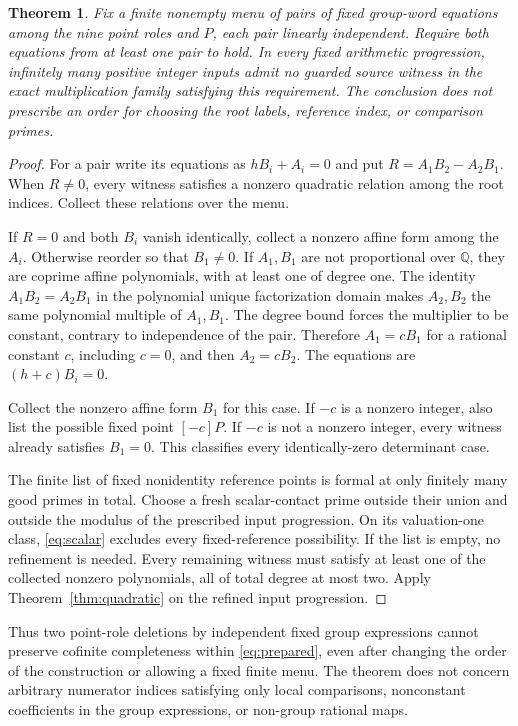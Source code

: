 \documentclass[11pt,a4paper]{article}
\newtheorem{theorem}{Theorem}[section]
\newcommand{\Q}{\mathbb Q}\newcommand{\Z}{\mathbb Z}
\begin{document}
\begin{theorem}\label{thm:two}
Fix a finite nonempty menu of pairs of fixed group-word equations
among the nine point roles and $P$, each pair linearly independent.
Require both equations from at least one pair to hold.
In every fixed arithmetic progression, infinitely many positive
integer inputs admit no guarded source witness in the exact
multiplication family satisfying this requirement. The conclusion
does not prescribe an order for choosing the root labels,
reference index, or comparison primes.
\end{theorem}
\begin{proof}
For a pair write its equations as $hB_i+A_i=0$ and put
$R=A_1B_2-A_2B_1$. When $R\ne0$, every witness satisfies a
nonzero quadratic relation among the root indices. Collect these
relations over the menu.

If $R=0$ and both $B_i$ vanish identically, collect a nonzero
affine form among the $A_i$. Otherwise reorder so that $B_1\ne0$.
If $A_1,B_1$ are not proportional over $\Q$, they are coprime
affine polynomials, with at least one of degree one. The identity
$A_1B_2=A_2B_1$ in the polynomial unique factorization domain
makes $A_2,B_2$ the same polynomial multiple of $A_1,B_1$.
The degree bound forces the multiplier to be constant, contrary
to independence of the pair. Therefore $A_1=cB_1$ for a rational
constant $c$, including $c=0$, and then $A_2=cB_2$. The equations
are $(h+c)B_i=0$.

Collect the nonzero affine form $B_1$ for this case. If $-c$ is
a nonzero integer, also list the possible fixed point $[-c]P$.
If $-c$ is not a nonzero integer, every witness already satisfies
$B_1=0$. This classifies every identically-zero determinant case.

The finite list of fixed nonidentity reference points is formal
at only finitely many good primes in total. Choose a fresh
scalar-contact prime outside their union and outside the modulus
of the prescribed input progression. On its valuation-one class,
\eqref{eq:scalar} excludes every fixed-reference possibility.
If the list is empty, no refinement is needed.
Every remaining witness must satisfy at least one of the collected
nonzero polynomials, all of total degree at most two. Apply
Theorem~\ref{thm:quadratic} on the refined input progression.
\end{proof}

Thus two point-role deletions by independent fixed group expressions
cannot preserve cofinite completeness within \eqref{eq:prepared},
even after changing the order of the construction or allowing a
fixed finite menu. The theorem does not concern arbitrary numerator
indices satisfying only local comparisons, nonconstant coefficients
in the group expressions, or non-group rational maps.
\end{document}
